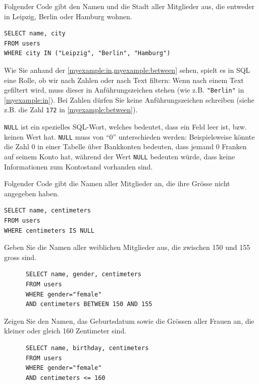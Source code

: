 \begin{myexample}\label{myexample:in}
Folgender Code gibt den Namen und die Stadt aller Mitglieder aus, die entweder in Leipzig, Berlin oder Hamburg wohnen.

\begin{lstlisting}
SELECT name, city
FROM users 
WHERE city IN ("Leipzig", "Berlin", "Hamburg")
\end{lstlisting}
\end{myexample}


\begin{mycaution}
Wie Sie anhand der \cref{myexample:in,myexample:between} sehen, spielt es in SQL eine Rolle, ob  wir nach Zahlen oder nach
  Text filtern: Wenn nach einem Text gefiltert wird, muss dieser in Anführungszeichen stehen (wie z.B.
  \lstinline|"Berlin"| in \cref{myexample:in}). Bei Zahlen dürfen Sie keine Anführungszeichen schreiben (siehe z.B. die Zahl
  \lstinline|172| in \cref{myexample:between}).
\end{mycaution}

\lstinline|NULL| ist ein spezielles \gls{SQL}-Wort, welches bedeutet, dass ein Feld leer ist, bzw. keinen
Wert hat. \lstinline|NULL| muss von \enquote{0} unterschieden werden: Beispielsweise könnte die Zahl 0 in einer 
Tabelle über Bankkonten bedeuten, dass jemand 0 Franken auf seinem Konto hat, während der Wert \lstinline|NULL| bedeuten würde, dass keine 
Informationen zum Kontostand vorhanden sind.

\begin{myexample}
  Folgender Code gibt die Namen aller Mitglieder an, die ihre Grösse nicht angegeben haben.
\begin{lstlisting}
SELECT name, centimeters
FROM users 
WHERE centimeters IS NULL
\end{lstlisting}
\end{myexample}


\begin{myexercise}
  Geben Sie die Namen aller weiblichen Mitglieder aus, die zwischen 150 und 155 gross sind.
  \begin{myanswer}
    \begin{lstlisting}
      SELECT name, gender, centimeters
      FROM users
      WHERE gender="female"
      AND centimeters BETWEEN 150 AND 155
    \end{lstlisting}
  \end{myanswer}
\end{myexercise}
\begin{myexercise}
  Zeigen Sie den Namen, das Geburtsdatum sowie die Grössen aller Frauen an, die kleiner oder gleich 160 Zentimeter sind.
  \begin{myanswer}
    \begin{lstlisting}
      SELECT name, birthday, centimeters
      FROM users
      WHERE gender="female"
      AND centimeters <= 160
    \end{lstlisting}
  \end{myanswer}
\end{myexercise}

